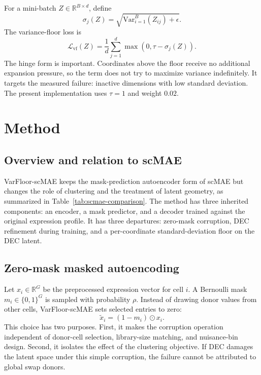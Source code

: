 \documentclass[11pt]{article}
\begin{document}
For a mini-batch $Z \in \mathbb{R}^{B \times d}$, define
\begin{equation}
\sigma_j(Z) = \sqrt{\mathrm{Var}_{i=1}^{B}(Z_{ij})+\epsilon}.
\end{equation}
The variance-floor loss is
\begin{equation}
\mathcal{L}_{\mathrm{vf}}(Z)
= \frac{1}{d}\sum_{j=1}^{d}\max(0,\tau-\sigma_j(Z)).
\end{equation}
The hinge form is important. Coordinates above the floor receive no additional expansion pressure, so the term does not try to maximize variance indefinitely. It targets the measured failure: inactive dimensions with low standard deviation. The present implementation uses $\tau=1$ and weight $0.02$.

\section{Method}

\subsection{Overview and relation to scMAE}

VarFloor-scMAE keeps the mask-prediction autoencoder form of scMAE but changes the role of clustering and the treatment of latent geometry, as summarized in Table~\ref{tab:scmae-comparison}. The method has three inherited components: an encoder, a mask predictor, and a decoder trained against the original expression profile. It has three departures: zero-mask corruption, DEC refinement during training, and a per-coordinate standard-deviation floor on the DEC latent.

\subsection{Zero-mask masked autoencoding}

Let $x_i \in \mathbb{R}^{G}$ be the preprocessed expression vector for cell $i$. A Bernoulli mask $m_i \in \{0,1\}^{G}$ is sampled with probability $\rho$. Instead of drawing donor values from other cells, VarFloor-scMAE sets selected entries to zero:
\begin{equation}
\tilde{x}_i = (1-m_i)\odot x_i.
\end{equation}
This choice has two purposes. First, it makes the corruption operation independent of donor-cell selection, library-size matching, and nuisance-bin design. Second, it isolates the effect of the clustering objective. If DEC damages the latent space under this simple corruption, the failure cannot be attributed to global swap donors.
\end{document}
